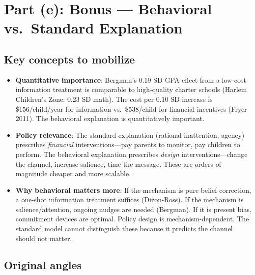\documentclass[11pt]{article}
\begin{document}
\section{Part (e): Bonus --- Behavioral vs.\ Standard Explanation}

\subsection{Key concepts to mobilize}

\begin{itemize}
  \item \textbf{Quantitative importance}: Bergman's 0.19 SD GPA effect from a low-cost information treatment is comparable to high-quality charter schools (Harlem Children's Zone: 0.23 SD math). The cost per 0.10 SD increase is \$156/child/year for information vs.\ \$538/child for financial incentives (Fryer 2011). The behavioral explanation is quantitatively important.
  \item \textbf{Policy relevance}: The standard explanation (rational inattention, agency) prescribes \emph{financial} interventions---pay parents to monitor, pay children to perform. The behavioral explanation prescribes \emph{design} interventions---change the channel, increase salience, time the message. These are orders of magnitude cheaper and more scalable.
  \item \textbf{Why behavioral matters more}: If the mechanism is pure belief correction, a one-shot information treatment suffices (Dizon-Ross). If the mechanism is salience/attention, ongoing nudges are needed (Bergman). If it is present bias, commitment devices are optimal. Policy design is mechanism-dependent. The standard model cannot distinguish these because it predicts the channel should not matter.
\end{itemize}

\subsection{Original angles}
\end{document}
